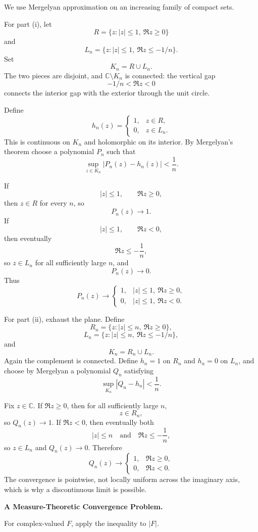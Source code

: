 \begin{solution}
We use Mergelyan approximation on an increasing family of compact sets.

For part (i), let
\[
R
=
\{z:|z|\le1,\ \Re z\ge0\}
\]
and
\[
L_n
=
\{z:|z|\le1,\ \Re z\le-1/n\}.
\]
Set
\[
K_n=R\cup L_n.
\]
The two pieces are disjoint, and \(\mathbb C\setminus K_n\) is connected: the vertical gap
\[
-1/n<\Re z<0
\]
connects the interior gap with the exterior through the unit circle.

Define
\[
h_n(z)
=
\begin{cases}
1,&z\in R,\\
0,&z\in L_n.
\end{cases}
\]
This is continuous on \(K_n\) and holomorphic on its interior. By Mergelyan's theorem choose
a polynomial \(P_n\) such that
\[
\sup_{z\in K_n}|P_n(z)-h_n(z)|<\frac1n.
\]

If
\[
|z|\le1,\qquad \Re z\ge0,
\]
then \(z\in R\) for every \(n\), so
\[
P_n(z)\to1.
\]
If
\[
|z|\le1,\qquad \Re z<0,
\]
then eventually
\[
\Re z\le-\frac1n,
\]
so \(z\in L_n\) for all sufficiently large \(n\), and
\[
P_n(z)\to0.
\]
Thus
\[
\boxed{
P_n(z)\to
\begin{cases}
1,&|z|\le1,\ \Re z\ge0,\\
0,&|z|\le1,\ \Re z<0.
\end{cases}
}
\]

For part (ii), exhaust the plane. Define
\[
R_n
=
\{z:|z|\le n,\ \Re z\ge0\},
\]
\[
L_n
=
\{z:|z|\le n,\ \Re z\le-1/n\},
\]
and
\[
K_n=R_n\cup L_n.
\]
Again the complement is connected. Define \(h_n=1\) on \(R_n\) and \(h_n=0\) on \(L_n\),
and choose by Mergelyan a polynomial \(Q_n\) satisfying
\[
\sup_{K_n}|Q_n-h_n|<\frac1n.
\]

Fix \(z\in\mathbb C\). If \(\Re z\ge0\), then for all sufficiently large \(n\),
\[
z\in R_n,
\]
so \(Q_n(z)\to1\). If \(\Re z<0\), then eventually both
\[
|z|\le n
\quad\text{and}\quad
\Re z\le-\frac1n,
\]
so \(z\in L_n\) and \(Q_n(z)\to0\). Therefore
\[
\boxed{
Q_n(z)\to
\begin{cases}
1,&\Re z\ge0,\\
0,&\Re z<0.
\end{cases}
}
\]
The convergence is pointwise, not locally uniform across the imaginary axis, which is why a
discontinuous limit is possible.
\end{solution}


\begin{problem}[CP-II-0489]
\label{prob:cp-ii-0489}
\textbf{A Measure-Theoretic Convergence Problem.}

\hspace*{1.5em}For complex-valued $F$, apply the inequality to $|F|$.
\end{problem}

